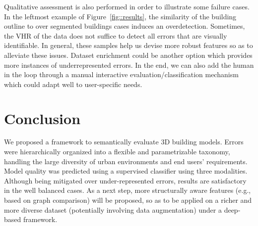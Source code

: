 \documentclass[conference]{IEEEtran}
\begin{document}
Qualitative assessment is also performed in order to illustrate some failure cases. In the leftmost example of Figure~\ref{fig::results}, the similarity of the building outline to over segmented buildings cases induces an overdetection. Sometimes, the VHR of the data does not suffice to detect all errors that are visually identifiable. In general, these samples help us devise more robust features so as to alleviate these issues. Dataset enrichment could be another option which provides more instances of underrepresented errors. In the end, we can also add the human in the loop through a manual interactive evaluation/classification mechanism which could adapt well to user-specific needs.



\section{Conclusion}
\label{sec::conclusion}

We proposed a framework to semantically evaluate 3D building models. Errors were hierarchically organized into a flexible and parametrizable taxonomy, handling the large diversity of urban environments and end users' requirements. Model quality was predicted using a supervised classifier using three modalities. Although being mitigated over under-represented errors, results are satisfactory in the well balanced cases. As a next step, more structurally aware features (e.g., based on graph comparison) will be proposed, so as to be applied on a richer and more diverse dataset (potentially involving data augmentation) under a deep-based framework.



\end{document}
